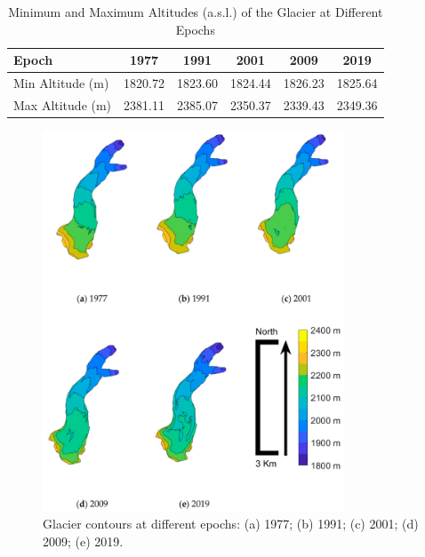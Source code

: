 {{\begin{table}[ht]
  \centering
  \caption{Minimum and Maximum Altitudes (a.s.l.) of the Glacier at Different Epochs}
  \label{tab:2:glacier_altitudes}
  \begin{tabular}{lccccc}
    \hline
    Epoch & 1977 & 1991 & 2001 & 2009 & 2019 \\
    \hline
    Min Altitude (m) & 1820.72 & 1823.60 & 1824.44 & 1826.23 & 1825.64 \\
    Max Altitude (m) & 2381.11 & 2385.07 & 2350.37 & 2339.43 & 2349.36 \\
    \hline
  \end{tabular}
\end{table}

\begin{figure}[ht!]
    \centering
    \includegraphics[width=0.8\textwidth]{results_contours.png}
    \caption{Glacier contours at different epochs: (a) 1977; (b) 1991; (c) 2001; (d) 2009; (e) 2019.}
    \label{fig:2:results_contour}
\end{figure}

}}
